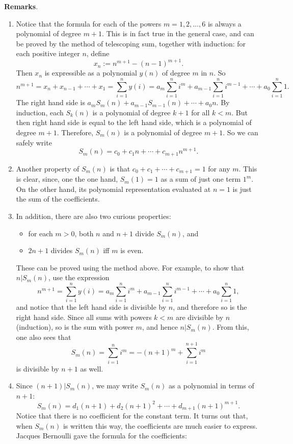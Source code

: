 \documentclass[12pt]{article}
\begin{document}
\textbf{Remarks}.
\begin{enumerate}
\item
Notice that the formula for each of the powers $m=1,2,\ldots, 6$ is always a polynomial of degree $m+1$.  This is in fact true in the general case, and can be proved by the method of telescoping sum, together with induction: for each positive integer $n$, define $$x_n:=n^{m+1}-(n-1)^{m+1}.$$  Then $x_n$ is expressible as a polynomial $y(n)$ of degree $m$ in $n$.  So $$n^{m+1}=x_n+x_{n-1}+\cdots +x_1 = \sum_{i=1}^n y(i)=a_m \sum_{i=1}^n i^m + a_{m-1}\sum_{i=1}^n i^{m-1} + \cdots + a_0 \sum_{i=1}^n 1.$$
The right hand side is $a_mS_m(n)+a_{m-1}S_{m-1}(n)+\cdots + a_0n$.  By induction, each $S_k(n)$ is a polynomial of degree $k+1$ for all $k<m$.  But then right hand side is equal to the left hand side, which is a polynomial of degree $m+1$. Therefore, $S_m(n)$ is a polynomial of degree $m+1$.  So we can safely write $$S_m(n)=c_0+c_1n+\cdots + c_{m+1}n^{m+1}.$$
\item
Another property of $S_m(n)$ is that $c_0+c_1+\cdots + c_{m+1}=1$ for any $m$.  This is clear, since, one the one hand, $S_m(1)=1$ as a sum of just one term $1^m$.  On the other hand, its polynomial representation evaluated at $n=1$ is just the sum of the coefficients.
\item
In addition, there are also two curious properties: 
\begin{itemize}
\item
for each $m>0$, both $n$ and $n+1$ divide $S_m(n)$, and 
\item
$2n+1$ divides $S_m(n)$ iff $m$ is even.
\end{itemize}
These can be proved using the method above.  For example, to show that $n|S_m(n)$, use the expression $$n^{m+1}= \sum_{i=1}^n y(i)=a_m \sum_{i=1}^n i^m + a_{m-1}\sum_{i=1}^n i^{m-1} + \cdots + a_0 \sum_{i=1}^n 1,$$ and notice that the left hand side is divisible by $n$, and therefore so is the right hand side.  Since all sums with powers $k<m$ are divisible by $n$ (induction), so is the sum with power $m$, and hence $n|S_m(n)$.  From this, one also sees that $$S_m(n)=\sum_{i=1}^n i^m=-(n+1)^m+\sum_{i=1}^{n+1} i^m $$ is divisible by $n+1$ as well.
\item
Since $(n+1)|S_m(n)$, we may write $S_m(n)$ as a polynomial in terms of $n+1$:  $$S_m(n)= d_1(n+1)+d_2(n+1)^2+\cdots + d_{m+1}(n+1)^{m+1}.$$  Notice that there is no coefficient for the constant term.  It turns out that, when $S_m(n)$ is written this way, the coefficients are much easier to express.  Jacques Bernoulli gave the formula for the coefficients: 

\end{enumerate}
\end{document}
